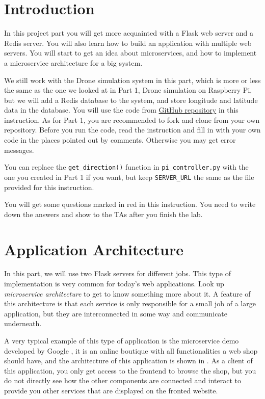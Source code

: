 \documentclass{article}
\begin{document}
\section{Introduction}
In this project part you will get more acquainted with a Flask web server and a Redis server. You will also learn how to build an application with multiple web servers. You will start to get an idea about microservices, and how to implement a microservice architecture for a big system.

We still work with the Drone simulation system in this part, which is more or less the same as the one we looked at in Part 1, Drone simulation on Raspberry Pi, but we will add a Redis database to the system, and store longitude and latitude data in the database.
You will use the code from  {\color{blue}\href{https://github.com/rogerhenriksson/InfoCom-Drone-2-Microservices}{GitHub repository} }in this instruction. As for Part 1, you are recommended to fork and clone from your own repository. Before you run the code, read the instruction and fill in with your own code in the places pointed out by comments. Otherwise you may get error messages.

You can replace the \verb!get_direction()! function in \verb!pi_controller.py! with the one you created in Part 1 if you want, but keep \verb!SERVER_URL! the same as the file provided for this instruction. 


\parbox[t]{14cm}{{You will get some questions marked in red in this instruction. You need to write down the answers and show to the TAs after you finish the lab.}}\vspace{0.2cm}

\section{Application Architecture}

In this part, we will use two Flask servers for different jobs. This type of implementation is very common for today's web applications. Look up \textit{microservice architecture} to get to know something more about it. A feature of this architecture is that each service is only responsible for a small job of a large application, but they are interconnected in some way and communicate underneath.

A very typical example of this type of application is the microservice demo developed by Google \cite{MD}, it is an online boutique with all functionalities a web shop should have, and the architecture of this application is shown in . As a client of this application, you only get access to the frontend to browse the shop, but you do not directly see how the other components are connected and interact to provide you other services that are displayed on the fronted website.
\end{document}
